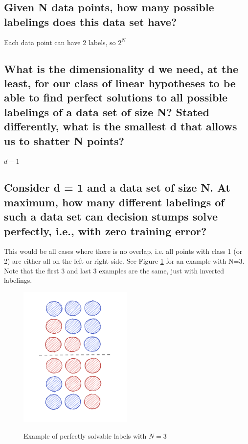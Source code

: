 \documentclass[11pt,a4paper]{article}
\begin{document}
\subsection{Given N data points, how many possible labelings does this data set have?}
\label{sec:2a}
Each data point can have 2 labels, so $2^N$

\subsection{What is the dimensionality d we need, at the least, for our class of linear hypotheses to
be able to find perfect solutions to all possible labelings of a data set of size N? Stated
differently, what is the smallest d that allows us to shatter N points?}
\label{sec:2b}
$d - 1$ 


\subsection{Consider d = 1 and a data set of size N. At maximum, how many different labelings of
such a data set can decision stumps solve perfectly, i.e., with zero training error?}
\label{sec:2c}
This would be all cases where there is no overlap, i.e. all points with class 1 (or 2) are either all on the left or right side. See Figure \ref{fig:d1n3} for an example with N=3. Note that the first 3 and last 3 examples are the same, just with inverted labelings.

\begin{figure}[h]
    \caption{Example of perfectly solvable labels with $N=3$}
    \centering
    \includegraphics[width=0.5\textwidth]{d1n3_possibilities.png}
    \label{fig:d1n3}
\end{figure}
\end{document}
